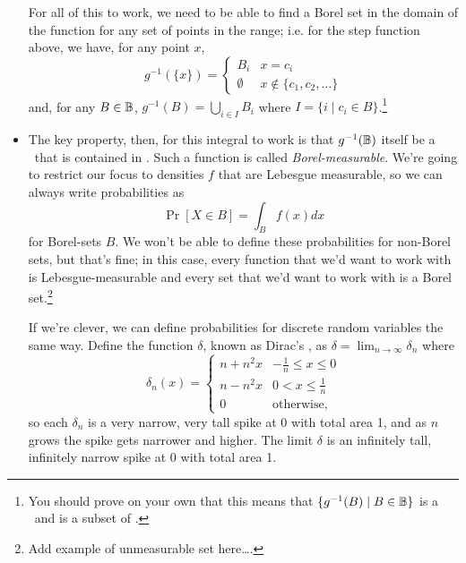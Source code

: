 \begin{itemize}[leftmargin=0pt]
  For all of this to work, we need to be able to find a Borel set in
  the domain of the function for any set of points in the range;
  i.e. for the step function above, we have, for any point $x$,
  \begin{equation*}
    g^{-1}(\{x\}) =
    \begin{cases}
      B_i & x = c_i \\
      \emptyset & x \notin \{c_1, c_2,\dots\}
    \end{cases}
  \end{equation*}
  and, for any $B \in \mathbb{B}$, $g^{-1}(B) = \bigcup_{i \in I} B_i$ where
  $I = \{i \mid c_i \in B\}$.\footnote{You should prove on your own
    that this means that $\{g^{-1}(B) \mid B \in \mathbb{B}\}$ is a
    \sigmaalgebra\ and is a subset of \BB.}

\item The key property, then, for this integral to work is that
  $g^{-1}(\mathbb{B})$ itself be a \sigmaalgebra\ that is contained in \BB.  Such
  a function is called \emph{Borel-measurable}.  We're going to
  restrict our focus to densities $f$ that are Lebesgue measurable, so
  we can always write probabilities as
  \begin{equation*}
    \Pr[X \in B] = \int_B f(x) dx
  \end{equation*}
  for Borel-sets $B$.  We won't be able to define these probabilities
  for non-Borel sets, but that's fine; in this case, every function
  that we'd want to work with is Lebesgue-measurable and every set
  that we'd want to work with is a Borel set.\footnote{Add example of
  unmeasurable set here\dots.}

  If we're clever, we can define probabilities for discrete random
  variables the same way.  Define the function $\delta$, known as Dirac's
  \deltafunction, as $\delta = \lim_{n \to \infty} \delta_n$ where
  \begin{equation*}
    \delta_n(x) =
    \begin{cases}
      n + n^2 x & - \tfrac{1}{n} \leq x \leq 0 \\
      n - n^2 x & 0 < x \leq \tfrac{1}{n} \\
      0        & \text{otherwise},
    \end{cases}
  \end{equation*}
  so each $\delta_n$ is a very narrow, very tall spike at 0 with total area
  1, and as $n$ grows the spike gets narrower and higher.  The limit
  $\delta$ is an infinitely tall, infinitely narrow spike at 0 with total
  area 1.


\end{itemize}
